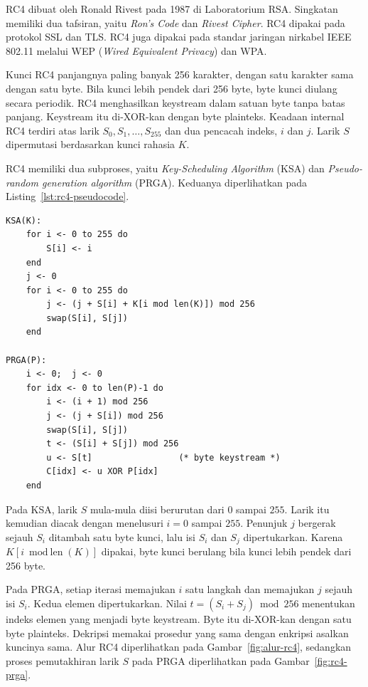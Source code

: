 RC4 dibuat oleh Ronald Rivest pada 1987 di Laboratorium RSA. Singkatan
 memiliki dua tafsiran, yaitu \textit{Ron's Code} dan \textit{Rivest
Cipher}. RC4 dipakai pada protokol SSL dan TLS. RC4 juga dipakai pada standar
jaringan nirkabel IEEE 802.11 melalui WEP (\textit{Wired Equivalent Privacy})
dan WPA.

Kunci RC4 panjangnya paling banyak 256 karakter, dengan satu karakter sama
dengan satu byte. Bila kunci lebih pendek dari 256 byte, byte kunci diulang
secara periodik. RC4 menghasilkan keystream dalam satuan byte tanpa batas
panjang. Keystream itu di-XOR-kan dengan byte plainteks. Keadaan internal RC4
terdiri atas larik $S_0, S_1, \dots, S_{255}$ dan dua pencacah indeks, $i$ dan
$j$. Larik $S$ dipermutasi berdasarkan kunci rahasia $K$.

RC4 memiliki dua subproses, yaitu \textit{Key-Scheduling Algorithm} (KSA) dan
\textit{Pseudo-random generation algorithm} (PRGA). Keduanya diperlihatkan pada
Listing~\ref{lst:rc4-pseudocode}.

\begin{lstlisting}[caption={Pseudokode RC4: KSA membentuk permutasi larik $S$, PRGA membangkitkan byte keystream}, label={lst:rc4-pseudocode}]
KSA(K):
    for i <- 0 to 255 do
        S[i] <- i
    end
    j <- 0
    for i <- 0 to 255 do
        j <- (j + S[i] + K[i mod len(K)]) mod 256
        swap(S[i], S[j])
    end

PRGA(P):
    i <- 0;  j <- 0
    for idx <- 0 to len(P)-1 do
        i <- (i + 1) mod 256
        j <- (j + S[i]) mod 256
        swap(S[i], S[j])
        t <- (S[i] + S[j]) mod 256
        u <- S[t]                 (* byte keystream *)
        C[idx] <- u XOR P[idx]
    end
\end{lstlisting}

Pada KSA, larik $S$ mula-mula diisi berurutan dari $0$ sampai $255$. Larik itu
kemudian diacak dengan menelusuri $i = 0$ sampai $255$. Penunjuk $j$ bergerak
sejauh $S_i$ ditambah satu byte kunci, lalu isi $S_i$ dan $S_j$ dipertukarkan.
Karena $K[i \bmod \text{len}(K)]$ dipakai, byte kunci berulang bila kunci lebih
pendek dari 256 byte.

Pada PRGA, setiap iterasi memajukan $i$ satu langkah dan memajukan $j$ sejauh
isi $S_i$. Kedua elemen dipertukarkan. Nilai $t = (S_i + S_j) \bmod 256$
menentukan indeks elemen yang menjadi byte keystream. Byte itu di-XOR-kan
dengan satu byte plainteks. Dekripsi memakai prosedur yang sama dengan
enkripsi asalkan kuncinya sama. Alur RC4 diperlihatkan pada
Gambar~\ref{fig:alur-rc4}, sedangkan proses pemutakhiran larik $S$ pada PRGA
diperlihatkan pada Gambar~\ref{fig:rc4-prga}.

